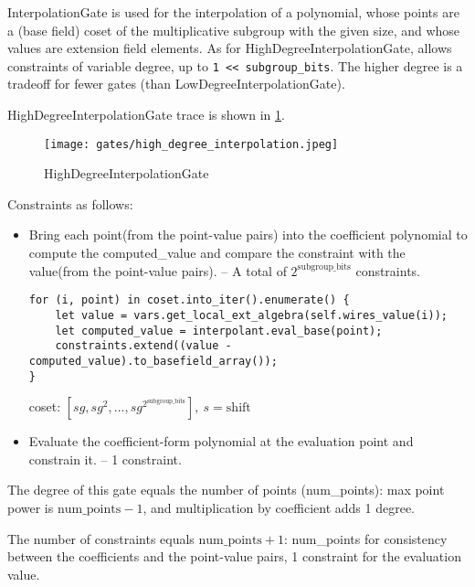 
\hspace*{\fill}

\indent InterpolationGate is used for the interpolation of a polynomial, whose points are a (base field) coset of the multiplicative subgroup 
with the given size, and whose values are extension field elements. As for HighDegreeInterpolationGate,  allows constraints of variable degree, 
up to \verb|1 << subgroup_bits|. The higher degree is a tradeoff for fewer gates (than LowDegreeInterpolationGate).


HighDegreeInterpolationGate trace is shown in \ref{fig:high-degree-interpolation}.

\begin{figure}[!ht]
    \centering
    \texttt{[image: gates/high\_degree\_interpolation.jpeg]}
    \caption{HighDegreeInterpolationGate}
    \label{fig:high-degree-interpolation}
\end{figure}


Constraints as follows:
\begin{itemize}
    \item Bring each point(from the point-value pairs) into the coefficient polynomial to compute the computed\_value 
    and compare the constraint with the value(from the point-value pairs). -- A total of $2^{\text{subgroup\_bits}}$ constraints.
    \begin{lstlisting}
for (i, point) in coset.into_iter().enumerate() {
    let value = vars.get_local_ext_algebra(self.wires_value(i));
    let computed_value = interpolant.eval_base(point);
    constraints.extend((value - computed_value).to_basefield_array());
}
    \end{lstlisting}
    coset: $[sg, sg^2,...,sg^{2^{\text{subgroup\_bits}}}], \ s=\text{shift}$
    \item Evaluate the coefficient-form polynomial at the evaluation point and constrain it. -- 1 constraint.
\end{itemize}

The degree of this gate equals the number of points (num\_points): max point power is $\text{num\_points} - 1$, and multiplication by coefficient adds 1 degree.

The number of constraints equals $\text{num\_points} + 1$: num\_points for consistency between the coefficients and the point-value pairs, 1 constraint for the evaluation value. 
